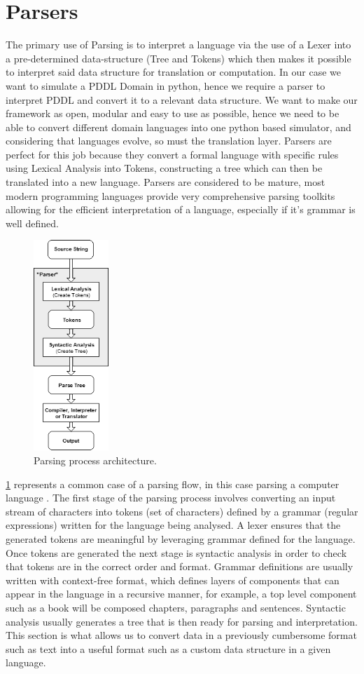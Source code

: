 \section{Parsers}
The primary use of Parsing is to interpret a language via the use of a Lexer into a pre-determined data-structure (Tree and Tokens) which then makes it possible to interpret said data structure for translation or computation.
In our case we want to simulate a PDDL Domain in python, hence we require a parser to interpret PDDL and convert it to a relevant data structure. We want to make our framework as open, modular and easy to use as possible, hence we need to be able to convert different domain languages into one python based simulator, and considering that languages evolve, so must the translation layer. Parsers are perfect for this job because they convert a formal language with specific rules using Lexical Analysis into Tokens, constructing a tree which can then be translated into a new language. Parsers are considered to be mature, most modern programming languages provide very comprehensive parsing toolkits allowing for the efficient interpretation of a language, especially if it's grammar is well defined.
\begin{figure}[h]
    \centering
    \includegraphics[height=300px]{images/architecture/parserflow}
    \caption{Parsing process architecture.}
    \label{fig:parserflow}
\end{figure}
\ref{fig:parserflow} represents a common case of a parsing flow, in this case parsing a computer language \cite{ParsingW23:online}. The first stage of the parsing process involves converting an input stream of characters into tokens (set of characters) defined by a grammar (regular expressions) written for the language being analysed. A lexer ensures that the generated tokens are meaningful by leveraging grammar defined for the language. Once tokens are generated the next stage is syntactic analysis in order to check that tokens are in the correct order and format. Grammar definitions are usually written with context-free format, which defines layers of components that can appear in the language in a recursive manner, for example, a top level component such as a book will be composed chapters, paragraphs and sentences. Syntactic analysis usually generates a tree that is then ready for parsing and interpretation. This section is what allows us to convert data in a previously cumbersome format such as text into a useful format such as a custom data structure in a given language.

